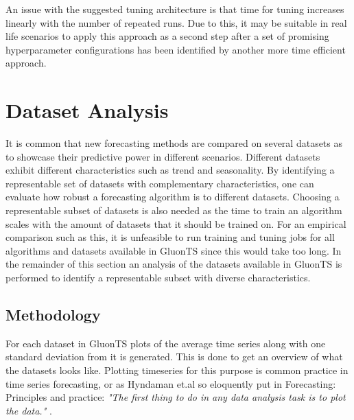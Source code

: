 An issue with the suggested tuning architecture is that time for tuning increases linearly with the number of repeated runs. Due to this, it may be suitable in real life scenarios to apply this approach as a second step after a set of promising hyperparameter configurations has been identified by another more time efficient approach.

\section{Dataset Analysis}
\label{sec:dataset_analysis}
It is common that new forecasting methods are compared on several datasets as to showcase their predictive power in different scenarios. Different datasets exhibit different characteristics such as trend and seasonality. By identifying a representable set of datasets with complementary characteristics, one can evaluate how robust a forecasting algorithm is to different datasets. Choosing a representable subset of datasets is also needed as the time to train an algorithm scales with the amount of datasets that it should be trained on. For an empirical comparison such as this, it is unfeasible to run training and tuning jobs for all algorithms and datasets available in GluonTS since this would take too long. In the remainder of this section an analysis of the datasets available in GluonTS is performed to identify a representable subset with diverse characteristics.

\subsection{Methodology}

For each dataset in GluonTS plots of the average time series along with one standard deviation from it is generated. This is done to get an overview of what the datasets looks like. Plotting timeseries for this purpose is common practice in time series forecasting, or as Hyndaman et.al so eloquently put in Forecasting: Principles and practice: \textit{"The first thing to do in any data analysis task is to plot the data."} \cite{hyndman_forecasting_3rd}.

